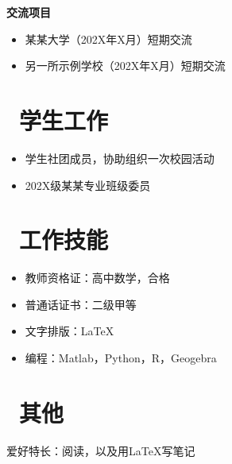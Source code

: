 \documentclass[11pt]{article}
\begin{document}
\textbf{交流项目}
\begin{itemize}
	\item 某某大学（202X年X月）短期交流
	\item 另一所示例学校（202X年X月）短期交流
\end{itemize}

%
%

\section{\makebox[\widthof{\faGraduationCap}][c]{\color{CVBlue}\faUsers}\ 学生工作}
\begin{itemize}
	\item 学生社团成员，协助组织一次校园活动
	\item 202X级某某专业班级委员
\end{itemize}

\section{\makebox[\widthof{\faGraduationCap}][c]{\color{CVBlue}\faWrench}\ 工作技能}

\begin{itemize}
	\item 教师资格证：高中数学，合格
	\item 普通话证书：二级甲等
	\item 文字排版：\LaTeX{}
	\item 编程：Matlab，Python，R，Geogebra

\end{itemize}

\section{\makebox[\widthof{\faGraduationCap}][c]{\color{CVBlue}\faTags}\ 其他}
爱好特长：阅读，以及用\LaTeX{}写笔记

\end{document}
